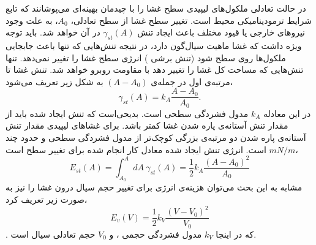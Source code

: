 در حالت تعادلی ملکول‌های لیپیدی سطح غشا را با چیدمان بهینه‌ای می‌پوشانند که تابع شرایط ترمودینامیکی محیط است. تغییر سطح غشا از سطح تعادلی، 
$A_0$،
 به علت وجود نیروهای خارجی یا قیود مختلف باعث ایجاد تنش  
$\gamma_{st}(A)$
در آن خواهد شد. باید توجه ویژه داشت که غشا ماهیت سیال‌گون دارد، در نتیجه تنش‌هایی که تنها باعث جابجایی ملکول‌ها روی سطح شود (تنش برشی
) انرژی سطح غشا را تغییر نمی‌دهد. تنها تنش‌هایی که مساحت کل غشا را تغییر دهد با مقاومت روبرو خواهد شد. تنش غشا تا مرتبه‌ی اول در جمله‌ی 
$(A-A_0)$
به شکل زیر تعریف می‌شود،
\begin{equation}
\gamma_{st}(A)=k_A\frac{A-A_0}{A_0}.
\end{equation}
در این معادله
$k_A$
مدول فشردگی سطحی
است. بدیحی‌است که  تنش ایجاد شده باید از مقدار تنش آستانه‌ی پاره شدن غشا کمتر باشد. برای غشاهای لیپیدی مقدار تنش آستانه‌ی پاره شدن دو مرتبه‌ی بزرگی کوچک‌تر از مدول فشردگی سطحی و حدود چند
$mN/m$
است. انرژی تنش ایجاد شده معادل کار انجام شده برای تغییر سطح است،
\begin{equation}
E_{st}(A)=\int_{A_0}^A dA~\gamma_{st}(A)=\frac{1}{2}k_A\frac{(A-A_0)^2}{A_0}
\label{eq:surfaceTension}
\end{equation}
مشابه به این بحث می‌توان هزینه‌ی انرژی برای تغییر حجم سیال درون غشا را نیز به صورت زیر تعریف کرد،
\begin{equation}
E_{v}(V)=\frac{1}{2}k_V\frac{(V-V_0)^2}{V_0}
\label{eq:volumeEnergy}
\end{equation}
. که در اینجا
$k_V$
مدول فشردگی حجمی
، و 
$V_0$
حجم تعادلی سیال است.







